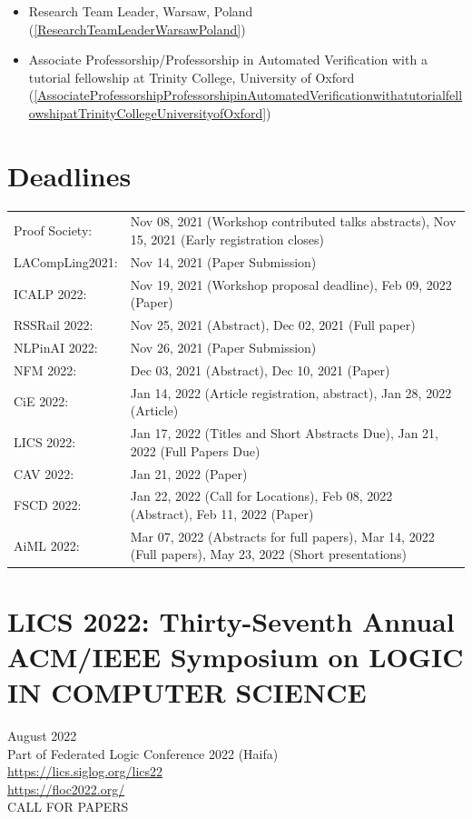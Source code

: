 \documentclass[prodmode,acmtecs]{acmsmall} %
\begin{document}
\begin{itemize}
\begin{itemize}\item Research Team Leader, Warsaw, Poland (\cref{ResearchTeamLeaderWarsawPoland})
\item Associate Professorship/Professorship in Automated Verification with a tutorial fellowship at Trinity College, University of Oxford (\cref{AssociateProfessorshipProfessorshipinAutomatedVerificationwithatutorialfellowshipatTrinityCollegeUniversityofOxford})
\end{itemize} 
\end{itemize}\section{Deadlines}\label{deadlines}\begin{tabulary}{\linewidth}{LL}Proof Society:  & Nov 08, 2021 (Workshop contributed talks abstracts), Nov 15, 2021 (Early registration closes) \\
LACompLing2021:  & Nov 14, 2021 (Paper Submission) \\
ICALP 2022:  & Nov 19, 2021 (Workshop proposal deadline), Feb 09, 2022 (Paper) \\
RSSRail 2022:  & Nov 25, 2021 (Abstract), Dec 02, 2021 (Full paper) \\
NLPinAI 2022:  & Nov 26, 2021 (Paper Submission) \\
NFM 2022:  & Dec 03, 2021 (Abstract), Dec 10, 2021 (Paper) \\
CiE 2022:  & Jan 14, 2022 (Article registration, abstract), Jan 28, 2022 (Article) \\
LICS 2022:  & Jan 17, 2022 (Titles and Short Abstracts Due), Jan 21, 2022 (Full Papers Due) \\
CAV 2022:  & Jan 21, 2022 (Paper) \\
FSCD 2022:  & Jan 22, 2022 (Call for Locations), Feb 08, 2022 (Abstract), Feb 11, 2022 (Paper) \\
AiML 2022:  & Mar 07, 2022 (Abstracts for full papers), Mar 14, 2022 (Full papers), May 23, 2022 (Short presentations) \\
\end{tabulary}
\section{LICS 2022: Thirty-Seventh Annual ACM/IEEE Symposium on LOGIC IN COMPUTER SCIENCE}\label{LICS2022}  August 2022\\ 
  Part of Federated Logic Conference 2022 (Haifa)\\ 
  \href{https://lics.siglog.org/lics22}{https://lics.siglog.org/lics22}\\ 
  \href{https://floc2022.org/}{https://floc2022.org/}\\ 
CALL FOR PAPERS 
\end{document}

